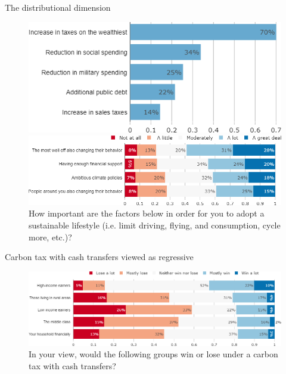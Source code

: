 \begin{framefont}{\small}
\begin{frame}{The distributional dimension}
\begin{figure}
	\vspace{-.2cm}
	\caption{%
	What sources of funding do you find appropriate for public investments in green infrastructure? (Multiple answers are possible)}
	\vspace{-.4cm}
	\includegraphics[width=.45\paperwidth]{../figures/FR/investments_funding_FR.png}
	\caption{How important are the factors below in order for you to adopt a sustainable lifestyle (i.e. limit driving, flying, and consumption, cycle more, etc.)?}
	\vspace{-.4cm}
	\includegraphics[width=.7\paperwidth]{../figures/FR/condition_FR.png}
\end{figure}
\end{frame}

\begin{frame}{Carbon tax with cash transfers viewed as regressive
	}%
	\begin{figure}[h!]
	\centering
	\caption{In your view, would the following groups win or lose under a carbon tax with cash transfers?}
	\includegraphics[width=.87\paperwidth]{../figures/FR/tax_transfers_win_lose_FR.png}
	\end{figure}
\end{frame}


\end{framefont}
